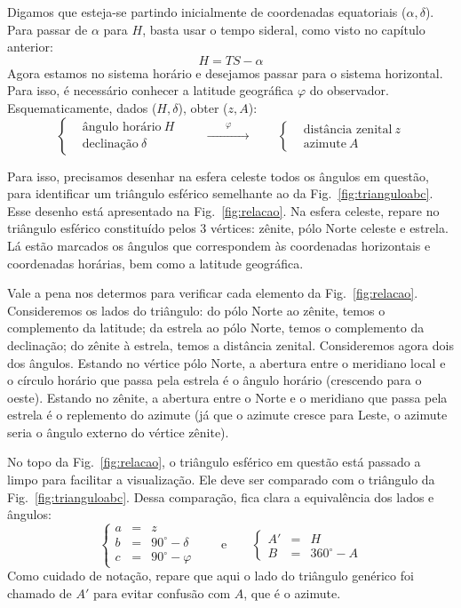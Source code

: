 Digamos que esteja-se partindo inicialmente de coordenadas equatoriais ($\alpha, \delta$). Para passar de $\alpha$ para $H$, basta usar o tempo sideral, como visto no capítulo anterior:
%
\[
 H = TS - \alpha
\]
%
Agora estamos no sistema horário e desejamos passar para o sistema horizontal. Para isso, é necessário conhecer a latitude geográfica $\varphi$ do observador. Esquematicamente, dados ($H, \delta$), obter ($z, A$):
%
\begin{equation*}
\left\{
\begin{aligned}
& \text{ângulo horário}~H\\
& \text{declinação}~\delta
\end{aligned}
\right.
\qquad \xrightarrow[\hspace{2cm}]{\varphi} \qquad
\left\{
\begin{aligned}
& \text{distância zenital}~z\\
& \text{azimute}~A
\end{aligned}
\right.
\end{equation*}

Para isso, precisamos desenhar na esfera celeste todos os ângulos em questão, para identificar um triângulo esférico semelhante ao da Fig.~\ref{fig:trianguloabc}. Esse desenho está apresentado na Fig.~\ref{fig:relacao}. Na esfera celeste, repare no triângulo esférico constituído pelos 3 vértices: zênite, pólo Norte celeste e estrela. Lá estão marcados os ângulos que correspondem às coordenadas horizontais e coordenadas horárias, bem como a latitude geográfica.

Vale a pena nos determos para verificar cada elemento da Fig.~\ref{fig:relacao}. Consideremos os lados do triângulo: do pólo Norte ao zênite, temos o complemento da latitude; da estrela ao pólo Norte, temos o complemento da declinação; do zênite à estrela, temos a distância zenital. Consideremos agora dois dos ângulos. Estando no vértice pólo Norte, a abertura entre o meridiano local e o círculo horário que passa pela estrela é o ângulo horário (crescendo para o oeste). Estando no zênite, a abertura entre o Norte e o meridiano que passa pela estrela é o replemento do azimute (já que o azimute cresce para Leste, o azimute seria o ângulo externo do vértice zênite).

No topo da Fig.~\ref{fig:relacao}, o triângulo esférico em questão está passado a limpo para facilitar a visualização. Ele deve ser comparado com o triângulo da Fig.~\ref{fig:trianguloabc}. Dessa comparação, fica clara a equivalência dos lados e ângulos:
%
\begin{equation} \label{equivalencia}
\left\{
\begin{aligned}
a &=& z \\
b &=& 90^{\circ} - \delta \\
c &=& 90^{\circ} - \varphi
\end{aligned}
\right.
\qquad \text{e} \qquad
\left\{
\begin{aligned}
A' &=& H \\
B  &=& 360^{\circ} - A
\end{aligned}
\right.
\end{equation}
%
Como cuidado de notação, repare que aqui o lado do triângulo genérico foi chamado de $A'$ para evitar confusão com $A$, que é o azimute.

